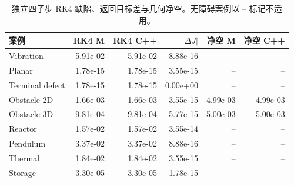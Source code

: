 \begin{table}[H]\centering\small
\caption{独立四子步 RK4 缺陷、返回目标差与几何净空。无障碍案例以 -- 标记不适用。}
\begin{tabular}{lrrrrr}\toprule
案例 & RK4 M & RK4 C++ & $|\Delta J|$ & 净空 M & 净空 C++\\\midrule
Vibration & 5.91e-02 & 5.91e-02 & 8.88e-16 & -- & --\\
Planar & 1.78e-15 & 1.78e-15 & 3.55e-15 & -- & --\\
Terminal defect & 1.78e-15 & 1.78e-15 & 0.00e+00 & -- & --\\
Obstacle 2D & 1.66e-03 & 1.66e-03 & 3.55e-15 & 4.99e-03 & 4.99e-03\\
Obstacle 3D & 9.81e-04 & 9.81e-04 & 5.77e-15 & 5.00e-03 & 5.00e-03\\
Reactor & 1.57e-02 & 1.57e-02 & 3.55e-14 & -- & --\\
Pendulum & 3.37e-02 & 3.37e-02 & 8.88e-16 & -- & --\\
Thermal & 1.84e-02 & 1.84e-02 & 3.55e-15 & -- & --\\
Storage & 3.30e-05 & 3.30e-05 & 1.78e-15 & -- & --\\
\bottomrule\end{tabular}\end{table}
